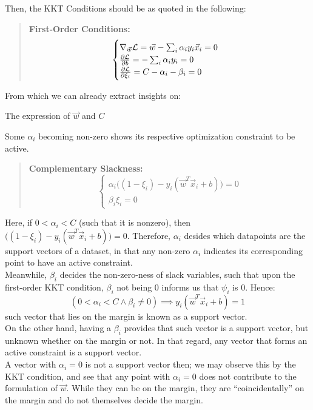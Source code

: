 Then, the KKT Conditions should be as quoted in the following:
\begin{quote}
    \textbf{First-Order Conditions:}
    \[
        \begin{cases}
            \nabla_{\vec{w}} \mathcal{L} = \vec{w} - \sum_i \alpha_i y_i \vec{x}_i = 0 \\
            \pdv{\mathcal{L}}{b} = -\sum_i \alpha_i y_i = 0 \\
            \pdv{\mathcal{L}}{\xi_i} = C - \alpha_i - \beta_i = 0
        \end{cases}
    \]
\end{quote}
From which we can already extract insights on:
\begin{bindenum}
    \item The expression of $\vec{w}$ and $C$
    \item Some $\alpha_i$ becoming non-zero shows its respective optimization constraint to be active.
\end{bindenum}
\begin{quote}
    \textbf{Complementary Slackness:}
    \[
        \begin{cases}
            \alpha_i \big( (1 - \xi_i) - y_i (\vec{w}^T \vec{x}_i + b) \big) = 0 \\
            \beta_i \xi_i = 0
        \end{cases}
    \]
\end{quote}
Here, if $0 < \alpha_i  < C$ (such that it is nonzero), then $\big( (1 - \xi_i) - y_i (\vec{w}^T \vec{x}_i + b) \big) = 0$.
Therefore, $\alpha_i$ desides which datapoints are the support vectors of a dataset, in that any non-zero $\alpha_i$ indicates its corresponding point to have an active constraint. \\
Meanwhile, $\beta_i$ decides the non-zero-ness of slack variables, such that upon the first-order KKT condition, $\beta_i$ not being $0$ informs us that $\psi_i$ is $0$.
Hence:
\[
    (0 < \alpha_i < C \land \beta_i \neq 0) \implies y_i (\vec{w}^T \vec{x}_i + b) = 1
\]
such vector that lies on the margin is known as a support vector. \\
On the other hand, having a $\beta_i$ provides that such vector is a support vector, but unknown whether on the margin or not.
In that regard, any vector that forms an active constraint is a support vector. \\
A vector with $\alpha_i = 0$ is not a support vector then; we may observe this by the KKT condition, and see that any point with $\alpha_i = 0$ does not contribute to the formulation of $\vec{w}$.
While they can be on the margin, they are ``coincidentally'' on the margin and do not themselves decide the margin.

